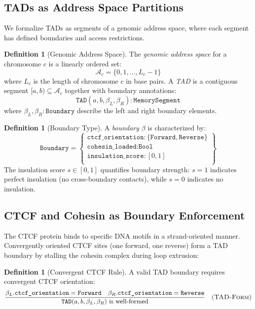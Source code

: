\documentclass[12pt,a4paper]{article}
\theoremstyle{plain}
\theoremstyle{definition}
\newtheorem{definition}[theorem]{Definition}
\begin{document}
\subsection{TADs as Address Space Partitions}

We formalize TADs as segments of a genomic address space, where each segment has defined boundaries and access restrictions.

\begin{definition}[Genomic Address Space]\label{def:address-space}
The \emph{genomic address space} for a chromosome $c$ is a linearly ordered set:
\[
  \mathcal{A}_c = \{0, 1, \ldots, L_c - 1\}
\]
where $L_c$ is the length of chromosome $c$ in base pairs. A \emph{TAD} is a contiguous segment $[a, b) \subseteq \mathcal{A}_c$ together with boundary annotations:
\[
  \texttt{TAD}(a, b, \beta_L, \beta_R) : \texttt{MemorySegment}
\]
where $\beta_L, \beta_R : \texttt{Boundary}$ describe the left and right boundary elements.
\end{definition}

\begin{definition}[Boundary Type]\label{def:boundary}
A \emph{boundary} $\beta$ is characterized by:
\[
  \texttt{Boundary} = \left\{
    \begin{array}{l}
      \texttt{ctcf\_orientation} : \{\texttt{Forward}, \texttt{Reverse}\} \\
      \texttt{cohesin\_loaded} : \texttt{Bool} \\
      \texttt{insulation\_score} : [0, 1] \\
    \end{array}
  \right\}
\]
The insulation score $s \in [0,1]$ quantifies boundary strength: $s = 1$ indicates perfect insulation (no cross-boundary contacts), while $s = 0$ indicates no insulation.
\end{definition}

\subsection{CTCF and Cohesin as Boundary Enforcement}

The CTCF protein binds to specific DNA motifs in a strand-oriented manner. Convergently oriented CTCF sites (one forward, one reverse) form a TAD boundary by stalling the cohesin complex during loop extrusion:

\begin{definition}[Convergent CTCF Rule]\label{def:ctcf-convergent}
A valid TAD boundary requires convergent CTCF orientation:
\[
\frac{\beta_L.\texttt{ctcf\_orientation} = \texttt{Forward} \quad \beta_R.\texttt{ctcf\_orientation} = \texttt{Reverse}}{\texttt{TAD}(a, b, \beta_L, \beta_R) \text{ is well-formed}}
\quad (\textsc{TAD-Form})
\]
\end{definition}
\end{document}
